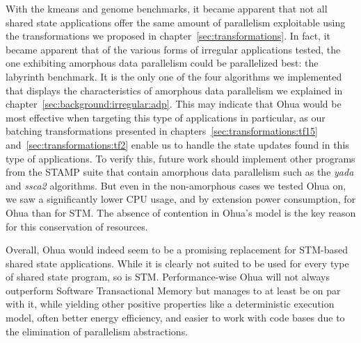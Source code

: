 With the kmeans and genome benchmarks, it became apparent that not all shared state applications offer the same amount of parallelism exploitable using the transformations we proposed in chapter~\ref{sec:transformations}.
In fact, it became apparent that of the various forms of irregular applications tested, the one exhibiting amorphous data parallelism could be parallelized best: the labyrinth benchmark.
It is the only one of the four algorithms we implemented that displays the characteristics of amorphous data parallelism we explained in chapter~\ref{sec:background:irregular:adp}.
This may indicate that Ohua would be most effective when targeting this type of applications in particular, as our batching transformations presented in chapters~\ref{sec:transformations:tf15} and~\ref{sec:transformations:tf2} enable us to handle the state updates found in this type of applications.
To verify this, future work should implement other programs from the STAMP suite that contain amorphous data parallelism such as the \emph{yada} and \emph{ssca2} algorithms.
But even in the non-amorphous cases we tested Ohua on, we saw a significantly lower CPU usage, and by extension power consumption, for Ohua than for STM.
The absence of contention in Ohua's model is the key reason for this conservation of resources.

Overall, Ohua would indeed seem to be a promising replacement for STM-based shared state applications.
While it is clearly not suited to be used for every type of shared state program, so is STM.
Performance-wise Ohua will not always outperform Software Transactional Memory but manages to at least be on par with it, while yielding other positive properties like a deterministic execution model, often better energy efficiency, and easier to work with code bases due to the elimination of parallelism abstractions.

